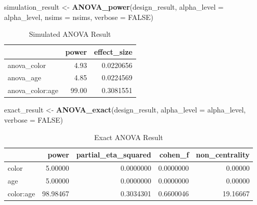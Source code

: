 \documentclass[]{book}
\newenvironment{Shaded}{\begin{snugshade}}{\end{snugshade}}
\newcommand{\DataTypeTok}[1]{\textcolor[rgb]{0.13,0.29,0.53}{#1}}
\newcommand{\KeywordTok}[1]{\textcolor[rgb]{0.13,0.29,0.53}{\textbf{#1}}}
\newcommand{\NormalTok}[1]{#1}
\newcommand{\OtherTok}[1]{\textcolor[rgb]{0.56,0.35,0.01}{#1}}
\newcommand{\StringTok}[1]{\textcolor[rgb]{0.31,0.60,0.02}{#1}}
\begin{document}
\begin{Shaded}
\begin{Highlighting}[]
\NormalTok{simulation_result <-}\StringTok{ }\KeywordTok{ANOVA_power}\NormalTok{(design_result, }
                                 \DataTypeTok{alpha_level =}\NormalTok{ alpha_level, }
                                 \DataTypeTok{nsims =}\NormalTok{ nsims,}
                                 \DataTypeTok{verbose =} \OtherTok{FALSE}\NormalTok{)}
\end{Highlighting}
\end{Shaded}

\begin{table}[!h]

\caption{\label{tab:unnamed-chunk-197}Simulated ANOVA Result}
\centering
\begin{tabular}{l|r|r}
\hline
  & power & effect\_size\\
\hline
anova\_color & 4.93 & 0.0220656\\
\hline
anova\_age & 4.85 & 0.0224569\\
\hline
anova\_color:age & 99.00 & 0.3081551\\
\hline
\end{tabular}
\end{table}

\begin{Shaded}
\begin{Highlighting}[]
\NormalTok{exact_result <-}\StringTok{ }\KeywordTok{ANOVA_exact}\NormalTok{(design_result,}
                            \DataTypeTok{alpha_level =}\NormalTok{ alpha_level,}
                            \DataTypeTok{verbose =} \OtherTok{FALSE}\NormalTok{)}
\end{Highlighting}
\end{Shaded}

\begin{table}[!h]

\caption{\label{tab:unnamed-chunk-199}Exact ANOVA Result}
\centering
\begin{tabular}{l|r|r|r|r}
\hline
  & power & partial\_eta\_squared & cohen\_f & non\_centrality\\
\hline
color & 5.00000 & 0.0000000 & 0.0000000 & 0.00000\\
\hline
age & 5.00000 & 0.0000000 & 0.0000000 & 0.00000\\
\hline
color:age & 98.98467 & 0.3034301 & 0.6600046 & 19.16667\\
\hline
\end{tabular}
\end{table}
\end{document}
